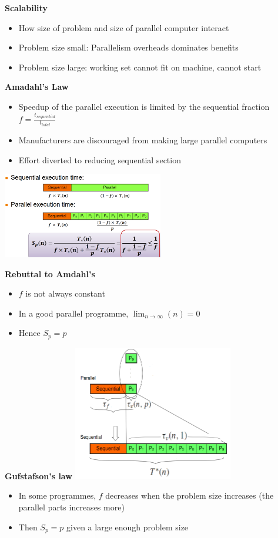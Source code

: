 \documentclass[10pt, landscape]{article}
\begin{document}
\begin{multicols}{4}
\textbf{Scalability}
\begin{itemize}
    \item How size of problem and size of parallel computer interact 
    \item Problem size small: Parallelism overheads dominates benefits 
    \item Problem size large: working set cannot fit on machine, cannot start
\end{itemize}

\textbf{Amadahl's Law}
\begin{itemize}
    \item Speedup of the parallel execution is limited by the sequential fraction $f= \frac{t_{sequential}}{t_{total}}$
    \item Manufacturers are discouraged from making large parallel computers
    \item Effort diverted to reducing sequential section
\end{itemize}
\includegraphics*[width=7cm]{amdahls.png}

\textbf{Rebuttal to Amdahl's}
\begin{itemize}
    \item $f$ is not always constant 
    \item In a good parallel programme, $\lim_{n\rightarrow \infty}(n)=0$
    \item Hence $S_{p}=p$
\end{itemize}

\textbf{Gufstafson's law}
\includegraphics*[width=7cm]{guslaw.png}
\begin{itemize}
    \item In some programmes, $f$ decreases when the problem size increases (the parallel parts increases more)
    \item Then $S_p=p$ given a large enough problem size
\end{itemize}


\end{multicols}
\end{document}
